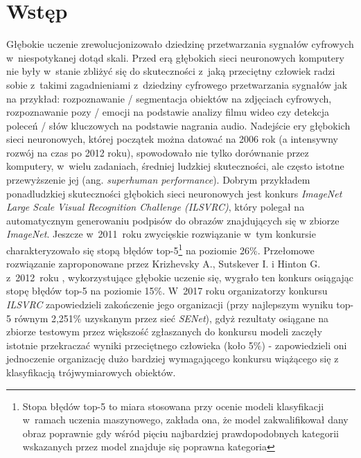 \section{Wstęp}

Głębokie uczenie zrewolucjonizowało dziedzinę przetwarzania sygnałów cyfrowych w~niespotykanej dotąd skali. Przed erą głębokich sieci neuronowych komputery nie były w~stanie zbliżyć się do skuteczności z~jaką przeciętny człowiek radzi sobie z~takimi zagadnieniami z~dziedziny cyfrowego przetwarzania sygnałów jak na przykład: rozpoznawanie / segmentacja obiektów na zdjęciach cyfrowych, rozpoznawanie pozy / emocji na podstawie analizy filmu wideo czy detekcja poleceń / słów kluczowych na podstawie nagrania audio. Nadejście ery głębokich sieci neuronowych, której początek można datować na 2006 rok (a intensywny rozwój na czas po 2012 roku), spowodowało nie tylko dorównanie przez komputery, w~wielu zadaniach, średniej ludzkiej skuteczności, ale często istotne przewyższenie jej (ang. \emph{superhuman performance}). Dobrym przykładem ponadludzkiej skuteczności głębokich sieci neuronowych jest konkurs \emph{ImageNet Large Scale Visual Recognition Challenge (ILSVRC)}, który polegał na automatycznym generowaniu podpisów do obrazów znajdujących się w zbiorze \emph{ImageNet}. Jeszcze w~2011~roku zwycięskie rozwiązanie w~tym konkursie charakteryzowało się stopą błędów top-5\footnote{Stopa błędów top-5 to miara stosowana przy ocenie modeli klasyfikacji w~ramach uczenia maszynowego, zakłada ona, że model zakwalifikował dany obraz poprawnie gdy wśród pięciu najbardziej prawdopodobnych kategorii wskazanych przez model znajduje się poprawna kategoria} na poziomie 26\%. Przełomowe rozwiązanie zaproponowane przez Krizhevsky A., Sutskever I. i Hinton G. z~2012~roku \cite{alexnet}, wykorzystujące głębokie uczenie się, wygrało ten konkurs osiągając stopę błędów top-5 na poziomie 15\%. W~2017 roku organizatorzy konkursu \emph{ILSVRC} zapowiedzieli zakończenie jego organizacji (przy najlepszym wyniku top-5 równym 2,251\% uzyskanym przez sieć \emph{SENet}), gdyż rezultaty osiągane na zbiorze testowym przez większość zgłaszanych do konkursu modeli zaczęły istotnie przekraczać wyniki przeciętnego człowieka (koło 5\%) - zapowiedzieli oni jednoczenie organizację dużo bardziej wymagającego konkursu wiążącego się z klasyfikacją trójwymiarowych obiektów.

